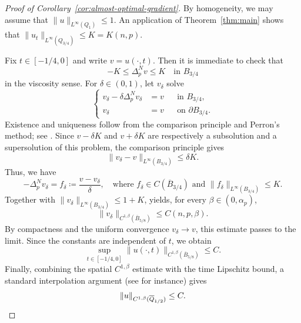 \documentclass[a4paper,11pt]{amsart}
\theoremstyle{plain}
\theoremstyle{definition}
\numberwithin{equation}{section}
\begin{document}
\begin{proof}[Proof of Corollary~\ref{cor:almost-optimal-gradient}]
By homogeneity, we may assume that $\|u\|_{L^\infty(Q_1)}\leq1$. An application of  Theorem~\ref{thm:main} shows that $\|u_t\|_{L^{\infty}(Q_{3/4})} \leq K=K(n, p)$.

Fix $t\in[-1/4,0]$ and write $v=u(\cdot,t)$. Then it is immediate to check that 
\begin{equation*}
-K\leq\Delta_p^N v\leq K \quad\text{in }B_{3/4}
\end{equation*}
in the viscosity sense. For $\delta\in(0,1)$, let $v_\delta$ solve
\begin{equation*}
\left\{\begin{aligned}
    v_\delta-\delta\Delta_p^N v_\delta&=v &&\text{in }B_{3/4},\\
    v_\delta&=v &&\text{on }\partial B_{3/4}.
\end{aligned}\right.
\end{equation*}
Existence and uniqueness follow from the comparison principle and Perron's method; see \cite[Section~4]{CIL92}. Since $v-\delta K$ and $v+\delta K$ are respectively a subsolution and a supersolution of this problem, the comparison principle gives
\begin{equation*}
\|v_\delta-v\|_{L^\infty(B_{3/4})}\leq\delta K.
\end{equation*}
Thus, we have
\begin{equation*}
-\Delta_p^N v_\delta=f_\delta \coloneqq\frac{v-v_\delta}{\delta},
\quad \text{where $f_\delta\in C(\overline{B}_{3/4})$ and $\|f_\delta\|_{L^\infty(B_{3/4})}\leq K$}.
\end{equation*}
Together with $\|v_\delta\|_{L^\infty(B_{3/4})}\leq1+K$, \cite[Theorem~1.3]{APR17} yields, for every $\beta\in(0,\alpha_p)$,
\begin{equation*}
\|v_\delta\|_{C^{1,\beta}(\overline{B}_{5/8})} \leq C(n,p,\beta).
\end{equation*}
By compactness and the uniform convergence $v_\delta\to v$, this estimate passes to the limit. Since the constants are independent of $t$, we obtain
\begin{equation*}
\sup_{t\in[-1/4,0]} \|u(\cdot,t)\|_{C^{1,\beta}(\overline{B}_{5/8})} \leq C.
\end{equation*}
Finally, combining the spatial $C^{1,\beta}$ estimate with the time Lipschitz bound, a standard interpolation argument (see \cite[Lemma~3.2]{LLYZ25} for instance) gives
\begin{equation*}
\|u\|_{C^{1,\beta}(\overline{Q}_{1/2})}\leq C. \qedhere
\end{equation*}
\end{proof}
\end{document}
